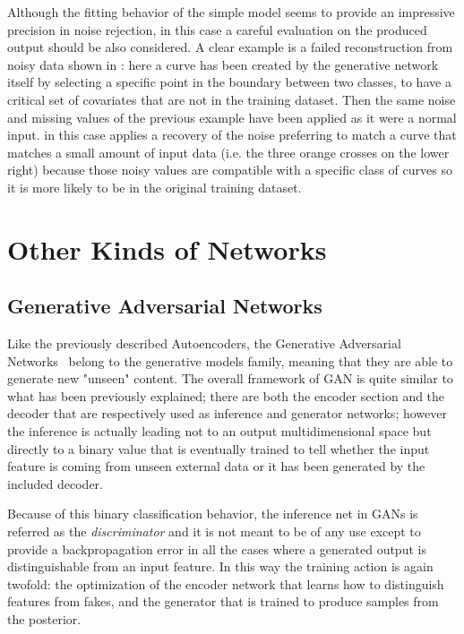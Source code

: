 Although the fitting behavior of the simple  model seems to provide an impressive precision in noise rejection, in this case a careful evaluation on the produced output should be also considered. A clear example is a failed reconstruction from noisy data shown in \Figure{\ref{fig:step1_noise_rejection_failed}}: here a curve has been created by the generative network itself by selecting a specific point in the boundary between two classes, to have a critical set of covariates that are not in the training dataset. Then the same noise and missing values of the previous example have been applied as it were a normal input.  in this case applies a recovery of the noise preferring to match a curve that matches a small amount of input data (i.e. the three orange crosses on the lower right) because those noisy values are compatible with a specific class of curves so it is more likely to be in the original training dataset.





\section{Other Kinds of Networks}

%
\subsection{Generative Adversarial Networks}
%
Like the previously described Autoencoders, the Generative Adversarial Networks~\cite{goodfellow2014generative} belong to the generative models family, meaning that they are able to generate new "unseen" content. The overall framework of GAN is quite similar to what has been previously explained; there are both the encoder section and the decoder that are respectively used as inference and generator networks; however the inference is actually leading not to an output multidimensional space but directly to a binary value that is eventually trained to tell whether the input feature is coming from unseen external data or it has been generated by the included decoder.

Because of this binary classification behavior, the inference net in GANs is referred as the \textit{discriminator} and it is not meant to be of any use except to provide a backpropagation error in all the cases where a generated output is distinguishable from an input feature. In this way the training action is again twofold: the optimization of the encoder network that learns how to distinguish features from fakes, and the generator that is trained to produce samples from the posterior.

